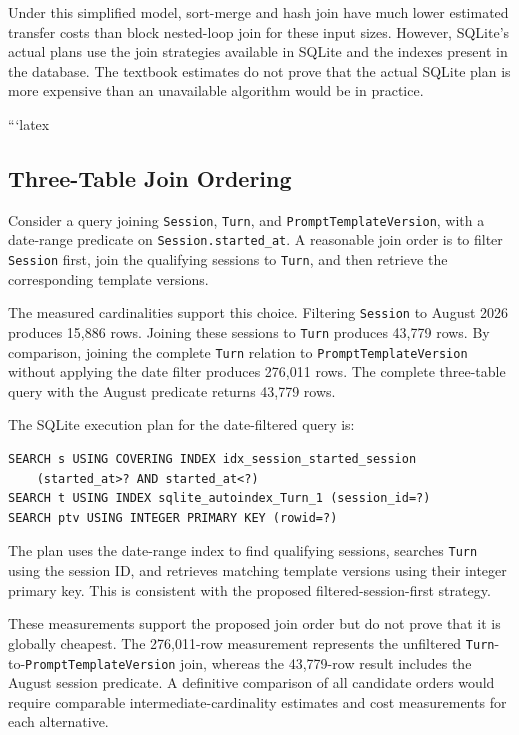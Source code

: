 \documentclass[11pt,a4paper]{article}
\begin{document}
Under this simplified model, sort-merge and hash join have much
lower estimated transfer costs than block nested-loop join for
these input sizes. However, SQLite's actual plans use the join
strategies available in SQLite and the indexes present in the
database. The textbook estimates do not prove that the actual
SQLite plan is more expensive than an unavailable algorithm would
be in practice.


```latex
\subsection{Three-Table Join Ordering}

Consider a query joining \texttt{Session}, \texttt{Turn}, and
\texttt{PromptTemplateVersion}, with a date-range predicate on
\texttt{Session.started\_at}. A reasonable join order is to filter
\texttt{Session} first, join the qualifying sessions to \texttt{Turn},
and then retrieve the corresponding template versions.

The measured cardinalities support this choice. Filtering
\texttt{Session} to August 2026 produces 15,886 rows. Joining these
sessions to \texttt{Turn} produces 43,779 rows. By comparison, joining
the complete \texttt{Turn} relation to \texttt{PromptTemplateVersion}
without applying the date filter produces 276,011 rows. The complete
three-table query with the August predicate returns 43,779 rows.

The SQLite execution plan for the date-filtered query is:

\begin{samepage}
\small
\begin{lstlisting}
SEARCH s USING COVERING INDEX idx_session_started_session
    (started_at>? AND started_at<?)
SEARCH t USING INDEX sqlite_autoindex_Turn_1 (session_id=?)
SEARCH ptv USING INTEGER PRIMARY KEY (rowid=?)
\end{lstlisting}
\end{samepage}

The plan uses the date-range index to find qualifying sessions,
searches \texttt{Turn} using the session ID, and retrieves matching
template versions using their integer primary key. This is consistent
with the proposed filtered-session-first strategy.

These measurements support the proposed join order but do not prove
that it is globally cheapest. The 276,011-row measurement represents
the unfiltered \texttt{Turn}-to-\texttt{PromptTemplateVersion} join,
whereas the 43,779-row result includes the August session predicate.
A definitive comparison of all candidate orders would require
comparable intermediate-cardinality estimates and cost measurements
for each alternative.
\end{document}
